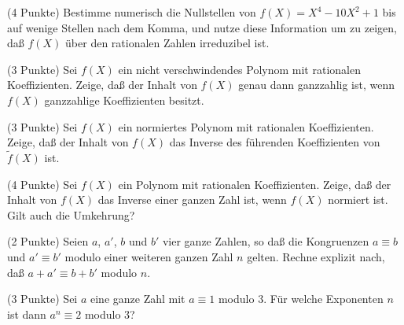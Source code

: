 \documentclass{algsheet}
\author{Dipl.-Math.~Franz Vogler}
\date{07.~Dezember 2010}
\begin{document}
                \maketitle





\begin{exercise}(4 Punkte)\newline
    Bestimme numerisch die Nullstellen von \(f(X) = X^4 - 10 X^2 + 1\)
    bis auf wenige Stellen nach dem Komma, und nutze diese Information um zu
    zeigen, daß \(f(X)\) über den rationalen Zahlen irreduzibel ist.
\end{exercise}

\begin{exercise}(3 Punkte)\newline
    Sei \(f(X)\) ein nicht verschwindendes Polynom mit rationalen Koeffizienten.
    Zeige, daß der Inhalt von \(f(X)\) genau dann ganzzahlig ist, wenn 
    \(f(X)\) ganzzahlige Koeffizienten besitzt.
\end{exercise}

\begin{exercise}(3 Punkte)\newline
    Sei \(f(X)\) ein normiertes Polynom mit rationalen Koeffizienten. Zeige,
    daß der Inhalt von \(f(X)\) das Inverse des führenden Koeffizienten von
    \(\tilde f(X)\) ist.
\end{exercise}

\begin{exercise}(4 Punkte)\newline
    Sei \(f(X)\) ein Polynom mit rationalen Koeffizienten. Zeige, daß
    der Inhalt von \(f(X)\) das Inverse einer ganzen Zahl ist, wenn
    \(f(X)\) normiert ist. Gilt auch die Umkehrung?
\end{exercise}





\begin{exercise}(2 Punkte)\newline
    Seien \(a\), \(a'\), \(b\) und \(b'\) vier ganze Zahlen, so daß die
    Kongruenzen \(a \equiv b\) und \(a' \equiv b'\) modulo einer weiteren
    ganzen Zahl \(n\) gelten.
    Rechne explizit nach, daß \(a + a' \equiv b + b'\) modulo \(n\).
\end{exercise}

\begin{exercise}(3 Punkte)\newline
    Sei \(a\) eine ganze Zahl mit \(a \equiv 1\) modulo \(3\). Für welche
    Exponenten \(n\) ist dann \(a^n \equiv 2\) modulo \(3\)?
\end{exercise}
\end{document}
